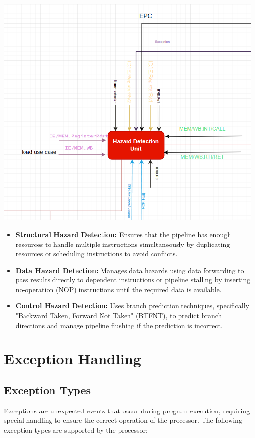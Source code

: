 \documentclass{report}
\begin{document}
\begin{center}
\begin{minipage}{0.75\textwidth}
\includegraphics[width=\textwidth]{./assets/HDU.png}
\end{minipage}
\end{center}

\begin{itemize}
    \item \textbf{Structural Hazard Detection:} Ensures that the pipeline has enough resources to handle multiple instructions simultaneously by duplicating resources or scheduling instructions to avoid conflicts.
    \item \textbf{Data Hazard Detection:} Manages data hazards using data forwarding to pass results directly to dependent instructions or pipeline stalling by inserting no-operation (NOP) instructions until the required data is available.
    \item \textbf{Control Hazard Detection:} Uses branch prediction techniques, specifically "Backward Taken, Forward Not Taken" (BTFNT), to predict branch directions and manage pipeline flushing if the prediction is incorrect.
\end{itemize}

\chapter{Exception Handling}

\section*{Exception Types}
Exceptions are unexpected events that occur during program execution, requiring special handling to ensure the correct operation of the processor. The following exception types are supported by the processor: \\
\end{document}
